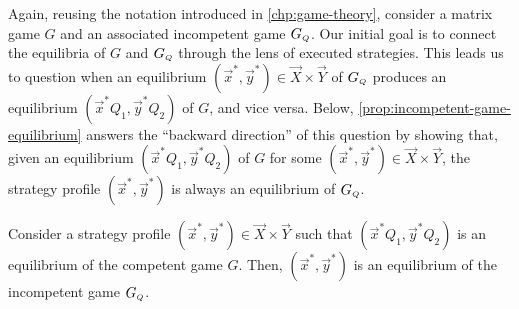     Again, reusing the notation introduced in \autoref{chp:game-theory}, consider a matrix game $G$ and an associated incompetent game $G_\ms{Q}$.
    Our initial goal is to connect the equilibria of $G$ and $G_\ms{Q}$ through the lens of executed strategies.
    This leads us to question when an equilibrium $(\vec{x}^*, \vec{y}^*) \in \vec{X} \times \vec{Y}$ of $G_\ms{Q}$ produces an equilibrium $(\vec{x}^* Q_1, \vec{y}^* Q_2)$ of $G$, and vice versa.
    Below, \autoref{prop:incompetent-game-equilibrium} answers the ``backward direction'' of this question by showing that, given an equilibrium $(\vec{x}^* Q_1, \vec{y}^* Q_2)$ of $G$ for some $(\vec{x}^*, \vec{y}^*) \in \vec{X} \times \vec{Y}$, the strategy profile $(\vec{x}^*, \vec{y}^*)$ is always an equilibrium of $G_\ms{Q}$.

    \begin{proposition}  \label{prop:incompetent-game-equilibrium}
        Consider a strategy profile $(\vec{x}^*, \vec{y}^*) \in \vec{X} \times \vec{Y}$ such that $(\vec{x}^* Q_1, \vec{y}^* Q_2)$ is an equilibrium of the competent game $G$.
        Then, $(\vec{x}^*, \vec{y}^*)$ is an equilibrium of the incompetent game $G_\ms{Q}$.
    \end{proposition}

